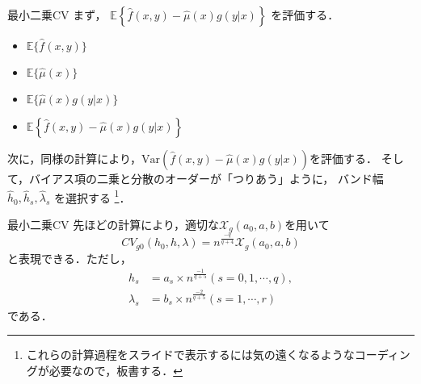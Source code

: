 \documentclass[xcolor=svgnames,dvipdfmx,cjk]{beamer}
\theoremstyle{example}
\begin{document}
\begin{frame}{最小二乗CV}
  \quad 
  まず，
  $\mathbb{E}\left\{
    \hat{f}(x,y) - \hat{\mu}(x) g(y|x)
  \right\} $
  を評価する．
  \begin{itemize}
    \item $\mathbb{E}\{\hat{f}(x,y)\}$
    \item $\mathbb{E}\{\hat{\mu}(x)\}$
    \item $\mathbb{E}\{\hat{\mu}(x) g(y|x)\}$
    \item $\mathbb{E}\left\{\hat{f}(x,y) - \hat{\mu}(x) g(y|x) \right\} $
  \end{itemize}
  次に，同様の計算により，$\text{Var}(\hat{f}(x,y) - \hat{\mu}(x) g(y|x))$を評価する．
  そして，バイアス項の二乗と分散のオーダーが「つりあう」ように，
  バンド幅$\hat{h}_0,\hat{h}_s, \hat{\lambda}_s$ を選択する
  \footnote{これらの計算過程をスライドで表示するには気の遠くなるようなコーディングが必要なので，板書する．}．
\end{frame}

\begin{frame}{最小二乗CV}
  \quad 
  先ほどの計算により，適切な$\mathcal{X}_g (a_0, a, b)$を用いて
  \[ CV_{g0} (h_0, h, \lambda) 
     = n^{\frac{-q}{q+4}} \mathcal{X}_g (a_0, a, b)
  \]
  と表現できる．ただし，
  \begin{align*}
    {h}_s 
      &= a_s \times n^{\frac{-1}{q+5}} (s = 0, 1, \cdots, q), \\
    {\lambda}_s 
      &= b_s \times n^{\frac{-2}{q+5}} (s = 1, \cdots, r)
  \end{align*}
  である．
\end{frame}
\end{document}
